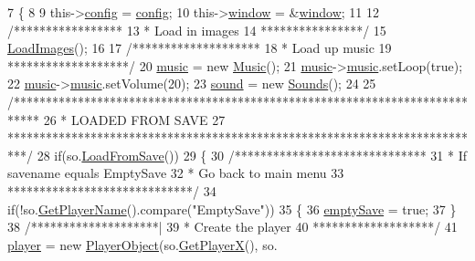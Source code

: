 \begin{DoxyCode}
7 \{
8 
9     this->\hyperlink{classTestApp_a17c4f18d8ef7c19da731a4bd13040d25}{config} = \hyperlink{classTestApp_a17c4f18d8ef7c19da731a4bd13040d25}{config};
10     this->\hyperlink{classTestApp_a0b6b080a777092db64519ef7c4309105}{window} = &\hyperlink{classTestApp_a0b6b080a777092db64519ef7c4309105}{window};
11 
12     \textcolor{comment}{/*****************}
13 \textcolor{comment}{     * Load in images}
14 \textcolor{comment}{     ****************/}
15     \hyperlink{classTestApp_a9ca5b1337188dbe749a999a46a8ad083}{LoadImages}();
16 
17     \textcolor{comment}{/********************}
18 \textcolor{comment}{     * Load up music}
19 \textcolor{comment}{     *******************/}
20     \hyperlink{classTestApp_a0aab55007364bd9b7c45a914feafd166}{music} = \textcolor{keyword}{new} \hyperlink{classMusic}{Music}();
21     \hyperlink{classTestApp_a0aab55007364bd9b7c45a914feafd166}{music}->\hyperlink{classMusic_a5b300a70ca62ec94d0e41c71bc0f9e40}{music}.setLoop(\textcolor{keyword}{true});
22     \hyperlink{classTestApp_a0aab55007364bd9b7c45a914feafd166}{music}->\hyperlink{classMusic_a5b300a70ca62ec94d0e41c71bc0f9e40}{music}.setVolume(20);
23     \hyperlink{classTestApp_acbd3cc98cd2e1802b56ff3e7fbad5b8f}{sound} = \textcolor{keyword}{new} \hyperlink{classSounds}{Sounds}();
24 
25     \textcolor{comment}{/****************************************************************************}
26 \textcolor{comment}{     *                            LOADED FROM SAVE}
27 \textcolor{comment}{     ***************************************************************************/}
28     \textcolor{keywordflow}{if}(so.\hyperlink{classSavedObject_a442295468ec8970e357f56f264b8b253}{LoadFromSave}())
29     \{
30         \textcolor{comment}{/******************************}
31 \textcolor{comment}{         * If savename equals EmptySave}
32 \textcolor{comment}{         * Go back to main menu}
33 \textcolor{comment}{         *****************************/}
34         \textcolor{keywordflow}{if}(!so.\hyperlink{classSavedObject_a6490504886dafe201eaa2c81b47e697c}{GetPlayerName}().compare(\textcolor{stringliteral}{"EmptySave"}))
35         \{
36             \hyperlink{classTestApp_a45fe06d0a24cd73ea34617760a432985}{emptySave} = \textcolor{keyword}{true};
37         \}
38         \textcolor{comment}{/********************|}
39 \textcolor{comment}{         * Create the player}
40 \textcolor{comment}{         *******************/}
41         \hyperlink{classTestApp_a72c21fba56a65699606328b9e765d6db}{player} = \textcolor{keyword}{new} \hyperlink{classPlayerObject}{PlayerObject}(so.\hyperlink{classSavedObject_ade1c165210cc9b69ed1b3dab85969640}{GetPlayerX}(), so.

\end{DoxyCode}

